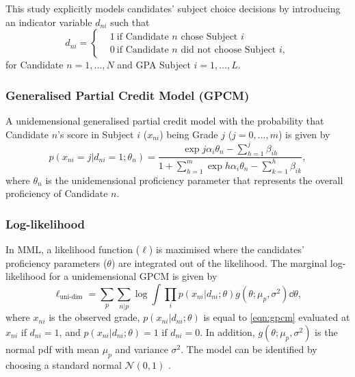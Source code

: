 This study explicitly models candidates' subject choice decisions by introducing an indicator variable $d_{ni}$ such that
\begin{equation}\label{eqn:indicator}
    d_{ni}=
    \left\{
        \begin{aligned}
            &1\ \text{if Candidate $n$ chose Subject $i$}\\
            &0\ \text{if Candidate $n$ did not choose Subject $i$},
        \end{aligned}
    \right.
\end{equation}
for Candidate $n = 1, \dots, N$ and GPA Subject $i = 1, \dots, L$.

\subsubsection{Generalised Partial Credit Model (GPCM)}

A unidemensional generalised partial credit model \parencite{muraki:1992} with the probability that Candidate $n$'s score in Subject $i$ ($x_{ni}$) being Grade $j$ ($j=0, \dots, m$) is given by
\begin{equation}\label{eqn:gpcm}
    p \left( x_{ni}=j | d_{ni} = 1; \theta_n \right) = \frac{\exp{j \alpha_i \theta_n - \sum_{h=1}^j \beta_{ih}} }{ 1 + \sum_{h=1}^m \exp{h \alpha_i \theta_n - \sum_{k=1}^h \beta_{ik}} },
\end{equation}
where $\theta_n$ is the unidemensional proficiency parameter that represents the overall proficiency of Candidate $n$.

\subsubsection{Log-likelihood}

In MML, a likelihood function ($\ell$) is maximised where the candidates' proficiency parameters ($\theta$) are integrated out of the likelihood. The marginal log-likelihood for a unidemensional GPCM is given by
\begin{equation}\label{eqn:ll}
    \ell_\text{uni-dim} = \sum_p \sum_{n | p} \log \int \prod_i p( x_{ni} | d_{ni}; \theta ) g(\theta; \mu_p, \sigma^2) \dd \theta,
\end{equation}
where $x_{ni}$ is the observed grade, $p( x_{ni} | d_{ni}; \theta )$ is equal to \cref{eqn:gpcm} evaluated at $x_{ni}$ if $d_{ni}=1$, and $p(x_{ni} | d_{ni}; \theta) = 1$ if $d_{ni} = 0$. In addition, $g(\theta; \mu_p, \sigma^2)$ is the normal pdf with mean $\mu_p$ and variance $\sigma^2$. The model can be identified by choosing a standard normal $\mathcal{N}(0,1)$ \parencite{korobko:2008}.

